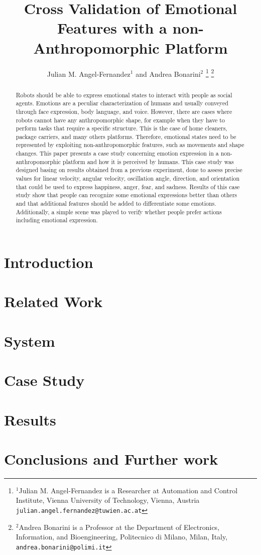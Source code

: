 \documentclass[letterpaper, 10 pt, conference]{ieeeconf}  %
\title{\LARGE \bf
Cross Validation of Emotional Features with a non-Anthropomorphic Platform
}
\author{Julian M. Angel-Fernandez$^{1}$ and Andrea Bonarini$^{2}$%
\thanks{$^{1}$Julian M. Angel-Fernandez is a Researcher at Automation and Control Institute, Vienna University of Technology, Vienna, Austria
        {\tt\small julian.angel.fernandez@tuwien.ac.at}}%
\thanks{$^{2}$Andrea Bonarini is a Professor at the Department of Electronics, Information, and Bioengineering, Politecnico di Milano, Milan, Italy,
        {\tt\small andrea.bonarini@polimi.it}}%
}
\begin{document}
\maketitle
\thispagestyle{empty}
\pagestyle{empty}


\begin{abstract}
Robots should be able to express emotional states to interact with people as social agents. Emotions are a peculiar characterization of humans and usually conveyed through face expression, body language, and voice. However, there are cases where robots cannot have any anthropomorphic shape, for example when they have to perform tasks that require a specific structure. This is the case of home cleaners, package carriers, and many others platforms. Therefore, emotional states need to be represented by exploiting non-anthropomorphic features, such as movements and shape changes. This paper presents a case study concerning emotion expression in a non-anthropomorphic platform and how it is perceived by humans. This case study was designed basing on results obtained from a previous experiment, done to assess precise values for linear velocity, angular velocity, oscillation angle, direction, and orientation that could be used to express happiness, anger, fear, and sadness. Results of this case study show that people can recognize some emotional expressions better than others and that additional features should be added to differentiate some emotions. Additionally, a simple scene was played to verify whether people prefer actions including emotional expression. 
\end{abstract}

\section{Introduction}

\section{Related Work}
\label{sec:related_work}

\section{System}
\label{sec:system}

\section{Case Study}
\label{sec:case}

\section{Results}
\label{sec:results}

\section{Conclusions and Further work}




\addtolength{\textheight}{-12cm}
\end{document}
